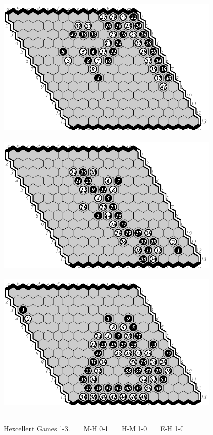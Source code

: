 \documentclass{icga}
\def\Hent{\mbox{\sc Hexcellent}}
\begin{document}
\begin{figure}[hbp]
\hspace*{-2cm}\
\includegraphics[scale=1]{pix/13.hm1.eps}\hspace*{-2cm}\
\includegraphics[scale=1]{pix/13.mh2.eps}\hspace*{-2cm}\
\includegraphics[scale=1]{pix/13.eh1.eps}\hspace*{-2cm}\
\caption{\Hent{} Games 1-3. ~ ~ M-H 0-1 ~ ~ H-M 1-0 ~ ~ E-H 1-0}
\end{figure}
\end{document}
